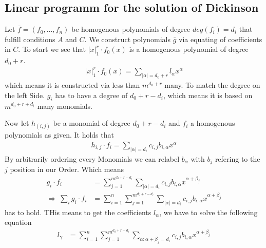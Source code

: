 \documentclass[./main.tex]{subfiles}
\begin{document}
\subsection{Linear programm for the solution of Dickinson}
Let $\bar f = (f_0,\dots,f_n)$ be homogenous polynomials of degree $deg(f_i) = d_i$ that fulfill conditions $A$ and $C$. We construct polynomials $\bar g$ via equating of coefficients in $C$. To start we see that $\vert x \vert_1^r \cdot f_0(x)$ is a homogenous polynomial of degree $d_0+r$.
\begin{align*}
\vert x \vert_1^r \cdot f_0(x) = \sum_{\vert \alpha \vert = d_0+r} l_\alpha x^\alpha
\end{align*}
which means it is constructed via less than $m^{d_0+r}$ many. To match the degree on the left Side. $g_i$ has to have a degree of $d_0+r-d_i$, which means it is based on $m^{d_0+r+d_i}$ many monomials.

Now let $h_{(i,j)}$ be a monomial of degree $d_0+r-d_i$ and $f_i$ a homogenous polynomials as given. It holds that
\begin{align*}
h_{i,j} \cdot f_i = \sum_{\vert \alpha \vert = d_i} c_{i,j} b_{i,\alpha} x^\alpha
\end{align*}
By arbitrarily ordering every Monomials we can relabel $b_\alpha$ with $b_{j}$ refering to the $j$ position in our Order. 
Which means 
\begin{align*}
g_i \cdot f_i &= \sum_{j=1}^{m^{d_0+r-d_i}}  \sum_{\vert \alpha \vert = d_i} c_{i,j} b_{i,\alpha} x^{\alpha+\beta_j}\\
\Rightarrow \ \sum_i g_i \cdot f_i &=  \sum_{i=1}^n \sum_{j=1}^{m^{d_0+r-d_i}}  \sum_{\vert \alpha \vert = d_i} c_{i,j} b_{i,\alpha} x^{\alpha+\beta_j}
\end{align*}
has to hold. THis means to get the coefficients $l_\alpha$, we have to solve the following equation
\begin{align*}
l_\gamma &=  \sum_{i=1}^n \sum_{j=1}^{m^{d_0+r-d_i}}  \sum_{ \alpha: \alpha + \beta_j = d_i} c_{i,j} b_{i,\alpha} x^{\alpha+\beta_j}
\end{align*}
\end{document}
